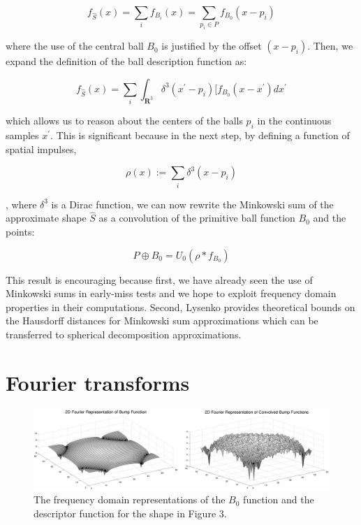 \documentclass[letterpaper, 10 pt, conference]{ieeeconf}
\begin{document}
\begin{equation}
 f_{\hat{S}}(x) = \sum_i f_{B_i}(x) = \sum_{p_i \in P} f_{B_0}(x - p_i)
\end{equation}

\noindent where the use of the central ball $B_0$ is justified by the offset $(x-p_i)$. Then, we 
expand the definition of the ball description function as:

\begin{equation}
 f_{\hat{S}}(x) = \sum_i \int_{\mathbf{R}^3} \delta^3(x^\prime-p_i)[f_{B_0}(x-x^\prime) dx^\prime
\end{equation}

\noindent which allows us to reason about the centers of the balls $p_i$ in the continuous samples
$x^\prime$. This is significant because in the next step, by defining a function of spatial impulses,

\begin{equation}
 \rho(x) := \sum_i \delta^3(x-p_i)
\end{equation}

\noindent, where $\delta^3$ is a Dirac function, we can now rewrite the
Minkowski sum of the approximate shape $\hat{S}$ as a convolution of the
primitive ball function $B_0$ and the points:

\begin{equation}
 P \oplus B_0 = U_0(\rho \ast f_{B_0})
\end{equation}

This result is encouraging because first, we have already seen the use of Minkowski sums in early-miss
tests and we hope to exploit frequency domain properties in their computations. Second, Lysenko provides
theoretical bounds on the Hausdorff distances for Minkowski sum approximations which can be transferred
to spherical decomposition approximations. \cite{lysenko2013fourier}

\section{Fourier transforms}

\begin{figure}[ht!] 
  \centering
  \includegraphics[width=1.0\linewidth]{Figures/bumpFouriers.png}
  \caption{The frequency domain representations of the $B_0$ function and the descriptor function for the shape in Figure 3.}
  \label{fig:bump}
\end{figure}
\end{document}
